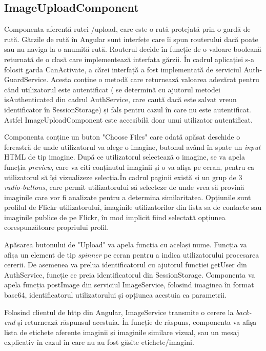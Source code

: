  \subsection{ImageUploadComponent}
Componenta aferentă rutei /upload, care este o rută protejată prin o gardă de rută. Gărzile de rută în Angular sunt interfețe care îi spun routerului dacă poate sau nu naviga la o anumită rută. Routerul decide în funcție de o valoare booleană returnată de o clasă care implementează interfața gărzii. În cadrul aplicației s-a folosit garda CanActivate, a cărei interfață a fost implementată de serviciul Auth-GuardService. Acesta conține o metodă care returnează valoarea adevărat pentru când utilizatorul este autentificat ( se determină cu ajutorul metodei isAuthenticated din cadrul AuthService, care caută dacă este salvat vreun identificator în SessionStorage) și fals pentru cazul în care nu este autentificat. Astfel ImageUploadComponent este accesibilă doar unui utilizator autentificat.

Componenta conține un buton "Choose Files" care odată apăsat deschide o fereastră de unde utilizatorul va alege o imagine, butonul având în spate un \textit{input} HTML de tip imagine. După ce utilizatorul selectează o imagine, se va apela funcția \textit{preview}, care va citi conținutul imaginii și o va afișa pe ecran, pentru ca utilizatorul să își vizualizeze selecția.În cadrul paginii există și un grup de 3 \textit{radio-buttons}, care permit utilizatorului să selecteze de unde vrea să provină imaginile care vor fi analizate pentru a determina similaritatea. Opțiunile sunt profilul de Flickr utilizatorului, imaginile utilizatorilor din lista sa de contacte sau imaginile publice de pe Flickr, în mod implicit fiind selectată opțiunea corespunzătoare propriului profil.

Apăsarea butonului de "Upload" va apela funcția cu același nume. Funcția va afișa un element de tip \textit{spinner} pe ecran pentru a indica utilizatorului procesarea cererii. De asemenea va prelua identificatorul cu ajutorul funcției getUser din AuthService, funcție ce preia identificatorul din SessionStorage. Componenta va apela funcția postImage din serviciul ImageService, folosind imaginea în format base64,  identificatorul utilizatorului și opțiunea acestuia ca parametrii.

Folosind clientul de http din Angular, ImageService transmite o cerere la \textit{back-end} și returnează răspunsul acestuia. În funcție de răspuns, componenta va afișa lista de etichete aferente imaginii și imaginile similare vizual, sau un mesaj explicativ în cazul în care nu au fost găsite etichete/imagini.

